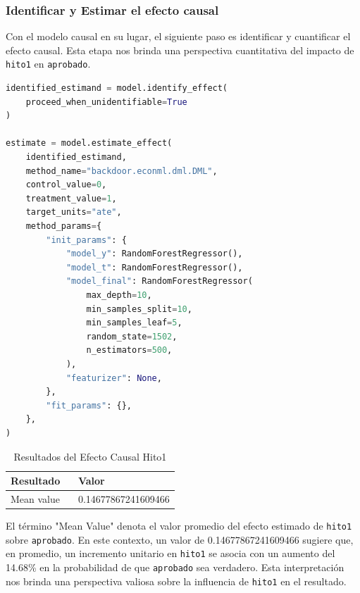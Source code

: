\subsubsection{Identificar y Estimar el efecto causal}

Con el modelo causal en su lugar, el siguiente paso es identificar y cuantificar el efecto causal. Esta etapa nos brinda una perspectiva cuantitativa del impacto de \texttt{hito1} en \texttt{aprobado}.

\begin{minipage}{0.5\textwidth}
    \begin{lstlisting}[language=Python, caption=Identificar y Estimar el efecto causal hito1, label=lst:IdentificarEstimarefectoCausalHito1]
identified_estimand = model.identify_effect(
    proceed_when_unidentifiable=True
)

estimate = model.estimate_effect(
    identified_estimand,
    method_name="backdoor.econml.dml.DML",
    control_value=0,
    treatment_value=1,
    target_units="ate",
    method_params={
        "init_params": {
            "model_y": RandomForestRegressor(),
            "model_t": RandomForestRegressor(),
            "model_final": RandomForestRegressor(
                max_depth=10,
                min_samples_split=10,
                min_samples_leaf=5,
                random_state=1502,
                n_estimators=500,
            ),
            "featurizer": None,
        },
        "fit_params": {},
    },
)
\end{lstlisting}
\end{minipage}
\hfill
\begin{minipage}{0.45\textwidth}
    \begin{table}[H]
        \centering        
        \begin{tabular}{lp{0.6\linewidth}}
            \toprule
            \textbf{Resultado} & \textbf{Valor} \\
            \midrule
            Mean value & 0.14677867241609466 \\
            \bottomrule
        \end{tabular}
        \caption{Resultados del Efecto Causal Hito1}
        \label{tab:efecto_causal_hito1}
    \end{table}
\end{minipage}

El término "Mean Value" denota el valor promedio del efecto estimado de \texttt{hito1} sobre \texttt{aprobado}. En este contexto, un valor de 0.14677867241609466 sugiere que, en promedio, un incremento unitario en \texttt{hito1} se asocia con un aumento del 14.68\% en la probabilidad de que \texttt{aprobado} sea verdadero. Esta interpretación nos brinda una perspectiva valiosa sobre la influencia de \texttt{hito1} en el resultado.

